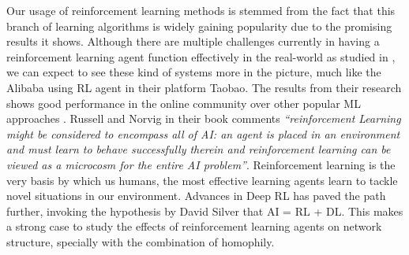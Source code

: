 Our usage of reinforcement learning methods is stemmed from the fact that this branch of learning algorithms is widely gaining popularity due to the promising results it shows. Although there are multiple challenges currently in having a reinforcement learning agent function effectively in the real-world as studied in \cite{dulac2019challenges}, we can expect to see these kind of systems more in the picture, much like the Alibaba using RL agent in their platform Taobao. The results from their research shows good performance in the online community over other popular ML approaches \cite{jin2018real,shi2019virtual}. Russell and Norvig in their book \cite{russell2016artificial} comments \textit{``reinforcement Learning might be considered to encompass all of AI: an agent is placed in an environment and must learn to behave successfully therein and reinforcement learning can be viewed as a microcosm for the entire AI problem''}. Reinforcement learning is the very basis by which us humans, the most effective learning agents learn to tackle novel situations in our environment. Advances in Deep RL has paved the path further, invoking the hypothesis by David Silver that AI = RL + DL. This makes a strong case to study the effects of reinforcement learning agents on network structure, specially with the combination of homophily.